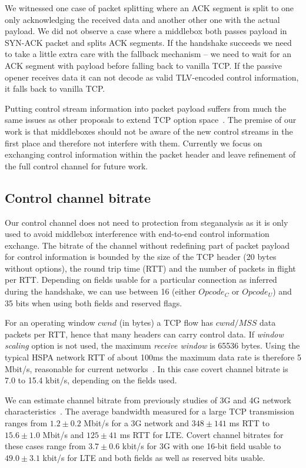 \documentclass{sig-alternate-10pt}
\begin{document}
We witnessed one case of packet splitting where an ACK segment is split to one only acknowledging the received data and another other one with the actual payload. We did not observe a case where a middlebox both passes payload in SYN-ACK packet and splits ACK segments. If the handshake succeeds we need to take a little extra care with the fallback mechanism -- we need to wait for an ACK segment with payload before falling back to vanilla TCP. If the passive opener receives data it can not decode as valid TLV-encoded control information, it falls back to vanilla TCP.

Putting control stream information into packet payload suffers from much the same issues as other proposals to extend TCP option space~\cite{Ramaiah:2012wa}. The premise of our work is that middleboxes should not be aware of the new control streams in the first place and therefore not interfere with them. Currently we focus on exchanging control information within the packet header and leave refinement of the full control channel for future work.

\subsection{Control channel bitrate}

Our control channel does not need to protection from steganalysis as it is only used to avoid middlebox interference with end-to-end control information exchange. The bitrate of the channel without redefining part of packet payload for control information is bounded by the size of the TCP header (20 bytes without options), the round trip time (RTT) and the number of packets in flight per RTT. Depending on fields usable for a particular connection as inferred during the handshake, we can use between 16 (either $Opcode_C$ or $Opcode_U$) and 35 bits when using both fields and reserved flags.

For an operating window $cwnd$ (in bytes) a TCP flow has $cwnd/MSS$ data packets per RTT, hence that many headers can carry control data. If \emph{window scaling} option is not used, the maximum \emph{receive window} is 65536 bytes. Using the typical HSPA network RTT of about 100ms the maximum data rate is therefore 5 Mbit/s, reasonable for current networks~\cite{Chen:2012vj}. In this case covert channel bitrate is 7.0 to 15.4 kbit/s, depending on the fields used.

We can estimate channel bitrate from previously studies of 3G and 4G network characteristics~\cite{Chen:2012vj}. The average bandwidth measured for a large TCP transmission ranges from $1.2\pm 0.2$ Mbit/s for a 3G network and $348\pm 141$ ms RTT to $15.6\pm 1.0$ Mbit/s and $125\pm 41$ ms RTT for LTE. Covert channel bitrates for these cases range from $3.7 \pm 0.6$ kbit/s for 3G with one 16-bit field usable to $49.0 \pm 3.1$ kbit/s for LTE and both fields as well as reserved bits usable.
\end{document}
